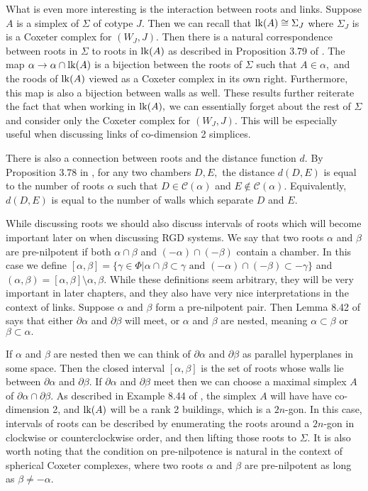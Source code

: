 \documentclass[class=book, crop=false,12 pt]{standalone}
\begin{document}
What is even more interesting is the interaction between roots and links. Suppose $A$ is a simplex of $\Sigma$ of cotype $J.$ Then we can recall that $\mathrm{lk}(A)\cong \Sigma_J$ where $\Sigma_J$ is is a Coxeter complex for $(W_J,J).$ Then there is a natural correspondence between roots in $\Sigma$ to roots in $\mathrm{lk}(A)$ as described in Proposition 3.79 of \cite{buildings}. The map $\alpha \to \alpha \cap \mathrm{lk}(A)$ is a bijection between the roots of $\Sigma$ such that $A\in \alpha,$ and the roods of $\mathrm{lk}(A)$ viewed as a Coxeter complex in its own right. Furthermore, this map is also a bijection between walls as well. These results further reiterate the fact that when working in $\mathrm{lk}(A),$ we can essentially forget about the rest of $\Sigma$ and consider only the Coxeter complex for $(W_J,J).$ This will be especially useful when discussing links of co-dimension 2 simplices.

There is also a connection between roots and the distance function $d.$ By Proposition 3.78 in \cite{buildings}, for any two chambers $D,E,$ the distance $d(D,E)$ is equal to the number of roots $\alpha$ such that $D\in \mathcal{C}(\alpha)$ and $E\not\in \mathcal{C}(\alpha).$ Equivalently, $d(D,E)$ is equal to the number of walls which separate $D$ and $E.$

While discussing roots we should also discuss intervals of roots which will become important later on when discussing RGD systems. We say that two roots $\alpha$ and $\beta$ are pre-nilpotent if both $\alpha\cap \beta$ and $(-\alpha)\cap (-\beta)$ contain a chamber. In this case we define $[\alpha,\beta]=\{\gamma\in \Phi|\alpha\cap \beta \subset \gamma \text{ and } (-\alpha)\cap (-\beta)\subset -\gamma\}$ and $(\alpha,\beta)=[\alpha,\beta]\setminus {\alpha,\beta}.$ While these definitions seem arbitrary, they will be very important in later chapters, and they also have very nice interpretations in the context of links. Suppose $\alpha$ and $\beta$ form a pre-nilpotent pair. Then Lemma 8.42 of \cite{buildings} says that either $\partial \alpha$ and $\partial \beta$ will meet, or $\alpha$ and $\beta$ are nested, meaning $\alpha\subset \beta$ or $\beta\subset \alpha.$

If $\alpha$ and $\beta$ are nested then we can think of $\partial \alpha$ and $\partial\beta$ as parallel hyperplanes in some space. Then the closed interval $[\alpha,\beta]$ is the set of roots whose walls lie between $\partial\alpha$ and $\partial\beta.$ If $\partial \alpha$ and $\partial\beta$ meet then we can choose a maximal simplex $A$ of $\partial\alpha\cap\partial\beta.$ As described in Example 8.44 of \cite{buildings}, the simplex $A$ will have have co-dimension 2, and $\mathrm{lk}(A)$ will be a rank 2 buildings, which is a $2n$-gon. In this case, intervals of roots can be described by enumerating the roots around a $2n$-gon in clockwise or counterclockwise order, and then lifting those roots to $\Sigma.$ It is also worth noting that the condition on pre-nilpotence is natural in the context of spherical Coxeter complexes, where two roots $\alpha$ and $\beta$ are pre-nilpotent as long as $\beta \neq -\alpha.$
\end{document}

